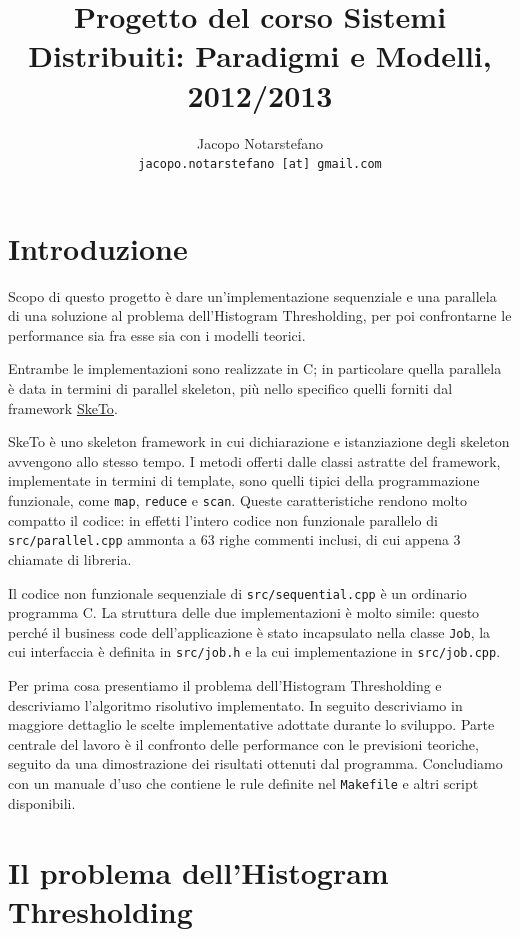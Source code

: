 \documentclass[12pt]{article}
\title{Progetto del corso Sistemi Distribuiti: Paradigmi e Modelli, 2012/2013}
\author{
	Jacopo Notarstefano\\
	\texttt{jacopo.notarstefano [at] gmail.com}
}
\date{}
\newcommand{\cpp}{C\nolinebreak\hspace{-.05em}\raisebox{.4ex}{\tiny\bf +}\nolinebreak\hspace{-.10em}\raisebox{.4ex}{\tiny\bf +}}
\begin{document}
  \maketitle
    \section{Introduzione}

    Scopo di questo progetto è dare un'implementazione sequenziale e una
    parallela di una soluzione al problema dell'Histogram Thresholding, per
    poi confrontarne le performance sia fra esse sia con i modelli teorici.

    Entrambe le implementazioni sono realizzate in \cpp; in particolare
    quella parallela è data in termini di parallel skeleton, più nello
    specifico quelli forniti dal framework 
    \href{http://sketo.ipl-lab.org/}{\underline{SkeTo}}.

    SkeTo è uno skeleton framework in cui dichiarazione e istanziazione degli
    skeleton avvengono allo stesso tempo. I metodi offerti dalle classi
    astratte del framework, implementate in termini di template, sono quelli
    tipici della programmazione funzionale, come \texttt{map}, \texttt{reduce}
    e \texttt{scan}. Queste caratteristiche rendono molto compatto il codice:
    in effetti l'intero codice non funzionale parallelo di
    \texttt{src/parallel.cpp} ammonta a \(63\) righe commenti inclusi, di cui
    appena \(3\) chiamate di libreria.

    Il codice non funzionale sequenziale di \texttt{src/sequential.cpp} \`e
    un ordinario programma \cpp. La struttura delle due implementazioni \`e
    molto simile: questo perch\'e il business code dell'applicazione \`e
    stato incapsulato nella classe \texttt{Job}, la cui interfaccia \`e
    definita in \texttt{src/job.h} e la cui implementazione in
    \texttt{src/job.cpp}.

    Per prima cosa presentiamo il problema dell'Histogram Thresholding e
    descriviamo l'algoritmo risolutivo implementato. In seguito descriviamo in
    maggiore dettaglio le scelte implementative adottate durante lo sviluppo.
    Parte centrale del lavoro \`e il confronto delle performance con le
    previsioni teoriche, seguito da una dimostrazione dei risultati ottenuti
    dal programma. Concludiamo con un manuale d'uso che contiene le rule
    definite nel \texttt{Makefile} e altri script disponibili.

    \section{Il problema dell'Histogram Thresholding}
\end{document}
